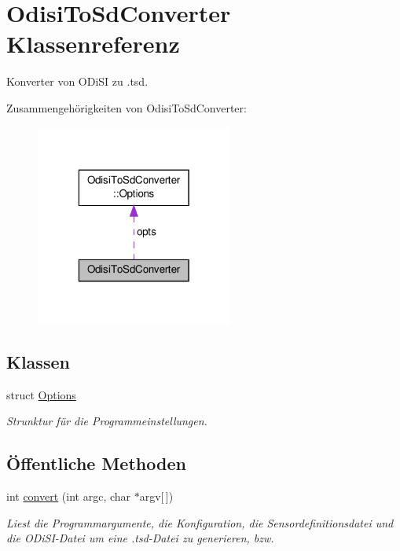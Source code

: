 \hypertarget{classOdisiToSdConverter}{\section{Odisi\-To\-Sd\-Converter Klassenreferenz}
\label{classOdisiToSdConverter}
}


Konverter von O\-Di\-S\-I zu .tsd.  




Zusammengehörigkeiten von Odisi\-To\-Sd\-Converter\-:\nopagebreak
\begin{figure}[H]
\begin{center}
\leavevmode
\includegraphics[width=184pt]{classOdisiToSdConverter__coll__graph}
\end{center}
\end{figure}
\subsection*{Klassen}
\begin{DoxyCompactItemize}
\item 
struct \hyperlink{structOdisiToSdConverter_1_1Options}{Options}
\begin{DoxyCompactList}\small\item\em Strunktur für die Programmeinstellungen. \end{DoxyCompactList}\end{DoxyCompactItemize}
\subsection*{Öffentliche Methoden}
\begin{DoxyCompactItemize}
\item 
int \hyperlink{classOdisiToSdConverter_ab4e518bcb8d7588180bb4e1edec50c06}{convert} (int argc, char $\ast$argv\mbox{[}$\,$\mbox{]})
\begin{DoxyCompactList}\small\item\em Liest die Programmargumente, die Konfiguration, die Sensordefinitionsdatei und die O\-Di\-S\-I-\/\-Datei um eine .tsd-\/\-Datei zu generieren, bzw. \end{DoxyCompactList}\end{DoxyCompactItemize}
